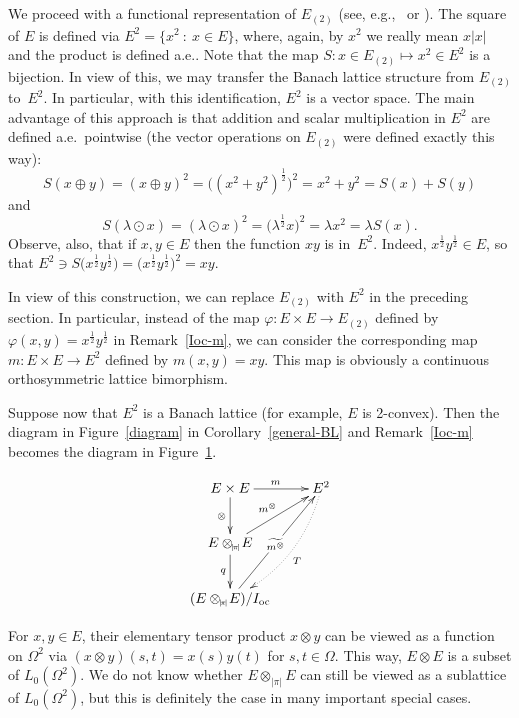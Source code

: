 \documentclass[12pt]{amsart}
\theoremstyle{plain}
\theoremstyle{definition}
\newcommand{\abs}[1]{\lvert#1\rvert}
\renewcommand{\mid}{\::\:}
\newcommand{\marg}[1]{\marginpar{\tiny #1}}
\def\api{{\abs{\!\pi\!}}}
\def\ftp{\otimes_{\!\scriptscriptstyle\api}\!}
\def\xyroot{x^{\frac{1}{2}}{y^{\frac{1}{2}}}}
\def\Ioc{I_{\rm oc}}
\begin{document}
We proceed with a functional representation of $E_{(2)}$ (see,
e.g.,~\cite{Buskes:01} or \cite[p.~30]{Johnson:01}). The square of $E$
is defined via $E^2=\{x^2\mid x\in E\}$, where, again, by $x^2$ we
really mean $x\abs{x}$ and the product is defined a.e..  Note that the
map $S\colon x\in E_{(2)}\mapsto x^2\in E^2$ is a bijection.  In view
of this, we may transfer the Banach lattice structure from $E_{(2)}$
to~$E^2$. In particular, with this identification, $E^2$ is a vector
space. The main advantage of this approach is that addition and scalar
multiplication in $E^2$ are defined a.e.\ pointwise (the vector
operations on $E_{(2)}$ were defined exactly this way):
\[
  S(x\oplus y)=(x\oplus y)^2=\bigl((x^2+y^2)^{\frac{1}{2}}\bigr)^2=
    x^2+y^2=S(x)+S(y)
\]
and
\[
  S(\lambda\odot x)=(\lambda\odot x)^2=
   \bigl(\lambda^{\frac{1}{2}}x\bigr)^2=\lambda x^2=\lambda S(x).
\]
Observe, also, that if $x,y\in E$ then the function $xy$ is in~$E^2$.
Indeed, $\xyroot\in E$, so that
\begin{math}
  E^2\ni S\bigl(\xyroot\bigr)
  =\bigl(\xyroot\bigr)^2=xy.
\end{math}

In view of this construction, we can replace $E_{(2)}$ with $E^2$ in
the preceding section. In particular, instead of the map
$\varphi\colon E\times E\to E_{(2)}$ defined by $\varphi(x,y)=\xyroot$
in Remark~\ref{Ioc-m}, we can consider the corresponding map $m\colon
E\times E\to E^2$ defined by $m(x,y)=xy$. This map is obviously a
continuous orthosymmetric lattice bimorphism.

Suppose now that $E^2$ is a Banach lattice (for example, $E$ is
2-convex). Then the diagram in Figure~\ref{diagram} in
Corollary~\ref{general-BL} and Remark~\ref{Ioc-m}
becomes the diagram in Figure~\ref{m-diagram}. 
\begin{figure}[!htb]\caption{}\label{m-diagram}
  \[\xymatrix{
  E\times E \ar[r]^m \ar[d]_{\otimes}  & E^2 \ar@{.>}@/^1pc/[ddl]^T\\
  E\ftp E \ar[ur]^{m^{\otimes}} \ar[d]_q &\\
  (E\ftp E)/\Ioc \ar[uur]|*+<4pt>{\scriptstyle{\widetilde{m^\otimes}}} &
  }
  \]
\end{figure}

For $x,y\in E$, their elementary tensor product $x\otimes y$ can be
viewed as a function on $\Omega^2$ via $(x\otimes y)(s,t)=x(s)y(t)$
for $s,t\in\Omega$. This way, $E\otimes E$ is a subset of
$L_0(\Omega^2)$. We do not know whether $E\ftp E$ can
still be viewed as a sublattice of $L_0(\Omega^2)$, but this is
definitely the case in many important special cases.
\end{document}
